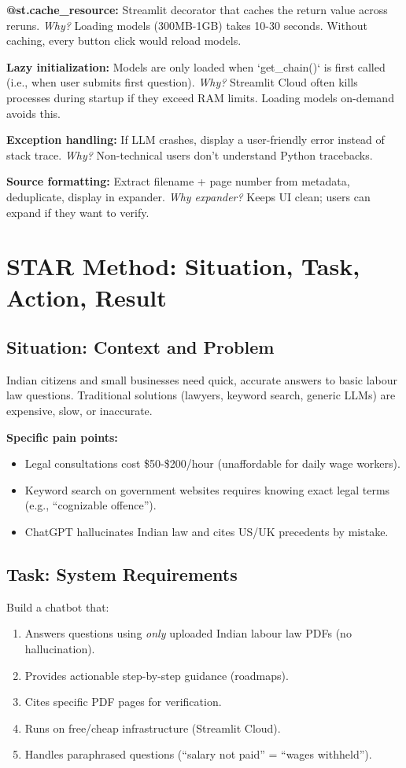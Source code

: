 \documentclass[11pt,a4paper]{article}
\begin{document}
\textbf{@st.cache\_resource:} Streamlit decorator that caches the return value across reruns. \textit{Why?} Loading models (300MB-1GB) takes 10-30 seconds. Without caching, every button click would reload models.

\textbf{Lazy initialization:} Models are only loaded when `get\_chain()` is first called (i.e., when user submits first question). \textit{Why?} Streamlit Cloud often kills processes during startup if they exceed RAM limits. Loading models on-demand avoids this.

\textbf{Exception handling:} If LLM crashes, display a user-friendly error instead of stack trace. \textit{Why?} Non-technical users don't understand Python tracebacks.

\textbf{Source formatting:} Extract filename + page number from metadata, deduplicate, display in expander. \textit{Why expander?} Keeps UI clean; users can expand if they want to verify.

\section{STAR Method: Situation, Task, Action, Result}

\subsection{Situation: Context and Problem}

Indian citizens and small businesses need quick, accurate answers to basic labour law questions. Traditional solutions (lawyers, keyword search, generic LLMs) are expensive, slow, or inaccurate.

\textbf{Specific pain points:}
\begin{itemize}
\item Legal consultations cost \$50-\$200/hour (unaffordable for daily wage workers).
\item Keyword search on government websites requires knowing exact legal terms (e.g., ``cognizable offence'').
\item ChatGPT hallucinates Indian law and cites US/UK precedents by mistake.
\end{itemize}

\subsection{Task: System Requirements}

Build a chatbot that:
\begin{enumerate}
\item Answers questions using \textit{only} uploaded Indian labour law PDFs (no hallucination).
\item Provides actionable step-by-step guidance (roadmaps).
\item Cites specific PDF pages for verification.
\item Runs on free/cheap infrastructure (Streamlit Cloud).
\item Handles paraphrased questions (``salary not paid'' = ``wages withheld'').
\end{enumerate}
\end{document}

